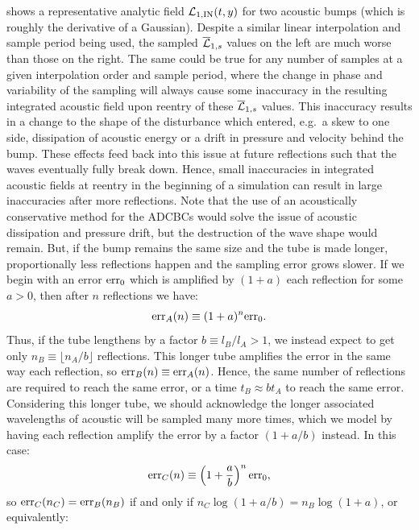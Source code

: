  shows a representative analytic field $\cl{L}_{1, \rm{IN}}(t, y)$ for two acoustic bumps (which is roughly the derivative of a Gaussian). Despite a similar linear interpolation and sample period being used, the sampled $\overline{\cl{L}}_{1, s}$ values on the left are much worse than those on the right. The same could be true for any number of samples at a given interpolation order and sample period, where the change in phase and variability of the sampling will always cause some inaccuracy in the resulting integrated acoustic field upon reentry of these $\overline{\cl{L}}_{1, s}$ values. This inaccuracy results in a change to the shape of the disturbance which entered, e.g.\ a skew to one side, dissipation of acoustic energy or a drift in pressure and velocity behind the bump. These effects feed back into this issue at future reflections such that the waves eventually fully break down. Hence, small inaccuracies in integrated acoustic fields at reentry in the beginning of a simulation can result in large inaccuracies after more reflections. Note that the use of an acoustically conservative method for the ADCBCs would solve the issue of acoustic dissipation and pressure drift, but the destruction of the wave shape would remain. But, if the bump remains the same size and the tube is made longer, proportionally less reflections happen and the sampling error grows slower. If we begin with an error $\rm{err}_0$ which is amplified by $(1 + a)$ each reflection for some $a > 0$, then after $n$ reflections we have:
\begin{equation}
\rm{err}_A(n) \equiv (1 + a)^{n} \rm{err}_0.
\end{equation}
Thus, if the tube lengthens by a factor $b \equiv l_B / l_A > 1$, we instead expect to get only $n_B \equiv \lfloor n_A / b \rfloor$ reflections. This longer tube amplifies the error in the same way each reflection, so $\rm{err}_B(n) \equiv \rm{err}_A(n)$. Hence, the same number of reflections are required to reach the same error, or a time $t_B \approx b t_A$ to reach the same error. Considering this longer tube, we should acknowledge the longer associated wavelengths of acoustic will be sampled many more times, which we model by having each reflection amplify the error by a factor $(1 + a / b)$ instead. In this case:
\begin{equation}
\rm{err}_C(n) \equiv \left( 1 + \frac{a}{b} \right)^n \rm{err}_0,
\end{equation}
so $\rm{err}_C(n_C) = \rm{err}_B(n_B)$ if and only if $n_C \log(1 + a / b) = n_B \log(1 + a)$, or equivalently:
